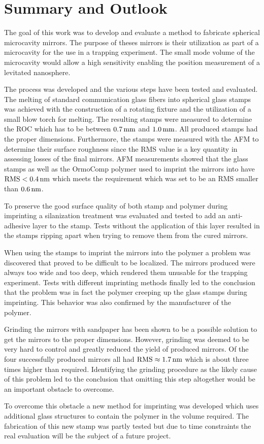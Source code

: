 \chapter{Summary and Outlook}
The goal of this work was to develop and evaluate a method to fabricate spherical microcavity mirrors. The purpose of theses mirrors is their utilization as part of a microcavity for the use in a trapping experiment. The small mode volume of the microcavity would allow a high sensitivity enabling the position measurement of a levitated nanosphere.

The process was developed and the various steps have been tested and evaluated. The melting of standard communication glass fibers into spherical glass stamps was achieved with the construction of a rotating fixture and the utilization of a small blow torch for melting. The resulting stamps were measured to determine the ROC which has to be between $0.7\mm$ and $1.0\mm$. All produced stamps had the proper dimensions. Furthermore, the stamps were measured with the AFM to determine their surface roughness since the RMS value is a key quantity in assessing losses of the final mirrors. AFM measurements showed that the glass stamps as well as the OrmoComp polymer used to imprint the mirrors into have $\si{RMS}<0.4\nm$ which meets the requirement which was set to be an RMS smaller than $0.6\nm$.

To preserve the good surface quality of both stamp and polymer during imprinting a silanization treatment was evaluated and tested to add an anti-adhesive layer to the stamp. Tests without the application of this layer resulted in the stamps ripping apart when trying to remove them from the cured mirrors.

When using the stamps to imprint the mirrors into the polymer a problem was discovered that proved to be difficult to be localized. The mirrors produced were always too wide and too deep, which rendered them unusable for the trapping experiment. Tests with different imprinting methods finally led to the conclusion that the problem was in fact the polymer creeping up the glass stamps during imprinting. This behavior was also confirmed by the manufacturer of the polymer. 

Grinding the mirrors with sandpaper has been shown to be a possible solution to get the mirrors to the proper dimensions. However, grinding was deemed to be very hard to control and greatly reduced the yield of produced mirrors. Of the four successfully produced mirrors all had $\si{RMS}\approx 1.7\nm$ which is about three times higher than required. Identifying the grinding procedure as the likely cause of this problem led to the conclusion that omitting this step altogether would be an important obstacle to overcome.

To overcome this obstacle a new method for imprinting was developed which uses additional glass structures to contain the polymer in the volume required. The fabrication of this new stamp was partly tested but due to time constraints the real evaluation will be the subject of a future project.